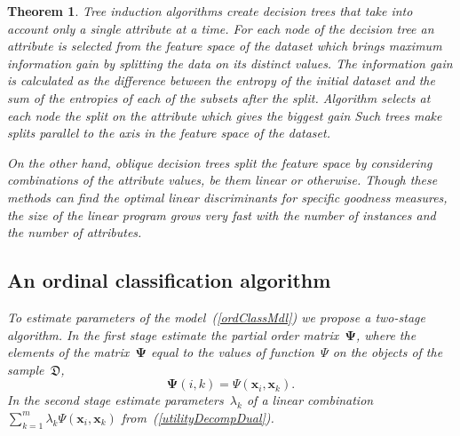 \documentclass[12pt,preprint]{elsarticle}
\newcommand{\bx}{\mathbf{x}}
\newcommand{\bPsi}{\boldsymbol{\Psi}}
\newtheorem{Theorem}{Theorem}
\begin{document}
\begin{Theorem}
Tree induction algorithms create decision trees that take into  account only a single attribute at  a time. For each node of the decision tree an attribute is selected from the  feature  space  of  the  dataset  which  brings  maximum information gain  by splitting the  data on its  distinct values. The information gain is  calculated as the difference between the entropy of the initial dataset and the sum of the entropies of each of the subsets after the split. Algorithm selects at each node the split on the attribute which gives the biggest gain Such trees  make splits parallel to the axis in the feature  space of the  dataset. 

On the other  hand, oblique decision  trees  split  the  feature  space  by  considering combinations  of  the  attribute  values,  be  them  linear  or otherwise. Though these methods can find the optimal linear discriminants for specific goodness measures, the size of the linear program grows very fast with the number of instances and the number of attributes.

\subsection{An ordinal classification algorithm}
To estimate parameters of the model~(\ref{ordClassMdl}) we propose a two-stage algorithm. In the first stage estimate the partial order matrix~$\bPsi$, where the elements of the matrix~$\bPsi$ equal to the values of function~$\Psi$ on the objects of the sample~$\mathfrak{D}$,
\[
\bPsi(i,k) = \Psi(\bx_i,\bx_k).
\]
In the second stage estimate parameters~$\lambda_k$ of a linear combination~$\sum\limits_{k=1}^m \lambda_{k} \Psi(\bx_i, \bx_k)$ from~(\ref{utilityDecompDual}).

\end{Theorem}
\end{document}
